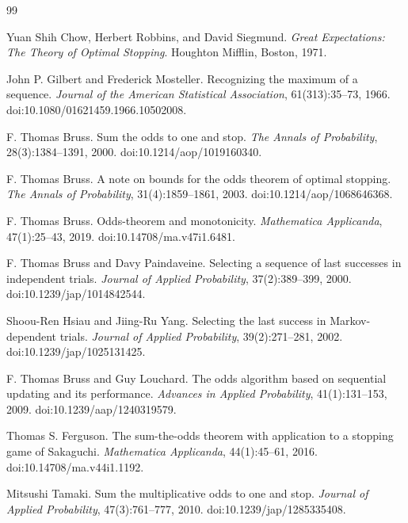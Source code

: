 \documentclass[11pt,a4paper]{article}
\begin{document}
\begin{thebibliography}{99}

Yuan Shih Chow, Herbert Robbins, and David Siegmund.
\newblock \emph{Great Expectations: The Theory of Optimal Stopping}.
\newblock Houghton Mifflin, Boston, 1971.

John P. Gilbert and Frederick Mosteller.
\newblock Recognizing the maximum of a sequence.
\newblock \emph{Journal of the American Statistical Association},
61(313):35--73, 1966.
\newblock doi:10.1080/01621459.1966.10502008.

F. Thomas Bruss.
\newblock Sum the odds to one and stop.
\newblock \emph{The Annals of Probability}, 28(3):1384--1391, 2000.
\newblock doi:10.1214/aop/1019160340.

F. Thomas Bruss.
\newblock A note on bounds for the odds theorem of optimal stopping.
\newblock \emph{The Annals of Probability}, 31(4):1859--1861, 2003.
\newblock doi:10.1214/aop/1068646368.

F. Thomas Bruss.
\newblock Odds-theorem and monotonicity.
\newblock \emph{Mathematica Applicanda}, 47(1):25--43, 2019.
\newblock doi:10.14708/ma.v47i1.6481.

F. Thomas Bruss and Davy Paindaveine.
\newblock Selecting a sequence of last successes in independent trials.
\newblock \emph{Journal of Applied Probability}, 37(2):389--399, 2000.
\newblock doi:10.1239/jap/1014842544.

Shoou-Ren Hsiau and Jiing-Ru Yang.
\newblock Selecting the last success in Markov-dependent trials.
\newblock \emph{Journal of Applied Probability}, 39(2):271--281, 2002.
\newblock doi:10.1239/jap/1025131425.

F. Thomas Bruss and Guy Louchard.
\newblock The odds algorithm based on sequential updating and its performance.
\newblock \emph{Advances in Applied Probability}, 41(1):131--153, 2009.
\newblock doi:10.1239/aap/1240319579.

Thomas S. Ferguson.
\newblock The sum-the-odds theorem with application to a stopping game of
Sakaguchi.
\newblock \emph{Mathematica Applicanda}, 44(1):45--61, 2016.
\newblock doi:10.14708/ma.v44i1.1192.

Mitsushi Tamaki.
\newblock Sum the multiplicative odds to one and stop.
\newblock \emph{Journal of Applied Probability}, 47(3):761--777, 2010.
\newblock doi:10.1239/jap/1285335408.


\end{thebibliography}
\end{document}

